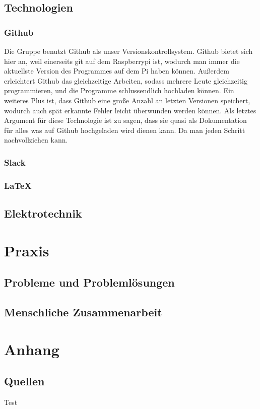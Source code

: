 \documentclass{report}
\begin{document}
\section{Technologien}

\subsection{Github}

Die Gruppe benutzt Github als unser Versionskontrollsystem. Github bietet sich hier an, weil einerseits git auf dem Raspberrypi ist, wodurch man immer die aktuellste Version des Programmes auf dem Pi haben können. Außerdem erleichtert Github das gleichzeitige Arbeiten, sodass mehrere Leute gleichzeitig programmieren, und die Programme schlussendlich hochladen können. Ein weiteres Plus ist, dass Github eine große Anzahl an letzten Versionen speichert, wodurch auch spät erkannte Fehler leicht überwunden werden können. Als letztes Argument für diese Technologie ist zu sagen, dass sie quasi als Dokumentation für alles was auf Github hochgeladen wird dienen kann. Da man jeden Schritt nachvollziehen kann. 

\subsection{Slack}

\subsection{\LaTeX}

\section{Elektrotechnik}

\chapter{Praxis}

\section{Probleme und Problemlösungen}

\section{Menschliche Zusammenarbeit}

\chapter{Anhang}
\section{Quellen}
Test
\end{document}
